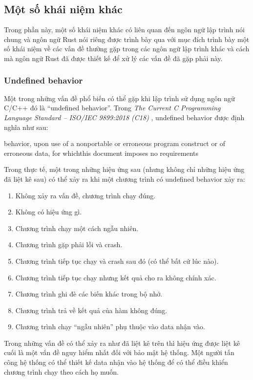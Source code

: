 \subsection{Một số khái niệm khác}
Trong phần này, một số khái niệm khác có liên quan đến ngôn ngữ lập trình nói chung và ngôn ngữ Rust nói riêng được trình bày qua với mục đích trình bày một số khái niệm về các vấn đề thường gặp trong các ngôn ngữ lập trình khác và cách mà ngôn ngữ Rust đã được thiết kế để xử lý các vấn đề đã gặp phải này.
\subsubsection{Undefined behavior}
Một trong những vấn đề phổ biến có thể gặp khi lập trình sử dụng ngôn ngữ C/C++ đó là ``undefined behavior''. Trong \emph{The Current C Programming Language Standard – ISO/IEC 9899:2018 (C18)} \cite{iso_iec_9899}, undefined behavior được định nghĩa như sau:

 behavior, upon use of a nonportable or erroneous program construct or of erroneous data, for whichthis document imposes no requirements

Trong thực tế, một trong những hiệu ứng sau (nhưng không chỉ những hiệu ứng đã liệt kê sau) có thể xảy ra khi một chương trình có undefined behavior xảy ra:

\begin{enumerate}
    \item Không xảy ra vấn đề, chương trình chạy đúng.
    \item Không có hiệu ứng gì.
    \item Chương trình chạy một cách ngẫu nhiên.
    \item Chương trình gặp phải lỗi và crash.
    \item Chương trình tiếp tục chạy và crash sau đó (có thể bất cứ lúc nào).
    \item Chương trình tiếp tục chạy nhưng kết quả cho ra không chính xác.
    \item Chương trình ghi đè các biến khác trong bộ nhớ.
    \item Chương trình trả về kết quả của hàm không đúng.
    \item Chương trình chạy ``ngẫu nhiên'' phụ thuộc vào data nhận vào.
\end{enumerate}

Trong những vấn đề có thể xảy ra như đã liệt kê trên thì hiệu ứng được liệt kê cuối là một vấn đề nguy hiểm nhất đối với bảo mật hệ thống.
Một người tấn công hệ thống có thể thiết kế data nhận vào hệ thống để có thể điều khiển chương trình chạy theo cách họ muốn.

